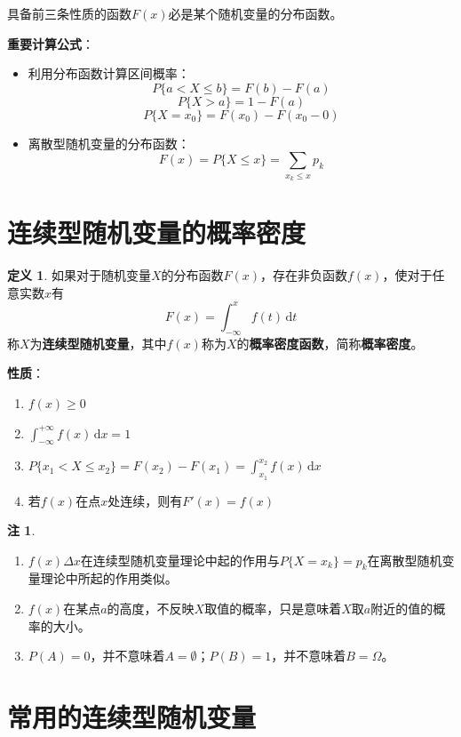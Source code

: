 \documentclass[11pt,a4paper]{report}
\theoremstyle{definition}
\newtheorem{definition}{定义}[chapter]
\newtheorem{remark}{注}[chapter]
\theoremstyle{plain}
\begin{document}
具备前三条性质的函数\(F(x)\)必是某个随机变量的分布函数。

\textbf{重要计算公式}：
\begin{itemize}[leftmargin=2em]
    \item 利用分布函数计算区间概率：
    \[
    P\{a<X\leq b\}=F(b)-F(a)
    \]
    \[
    P\{X>a\}=1-F(a)
    \]
    \[
    P\{X=x_0\}=F(x_0)-F(x_0-0)
    \]
    \item 离散型随机变量的分布函数：
    \[
    F(x)=P\{X\leq x\}=\sum_{x_k\leq x}p_k
    \]
\end{itemize}

\section{连续型随机变量的概率密度}

\begin{definition}
如果对于随机变量\(X\)的分布函数\(F(x)\)，存在非负函数\(f(x)\)，使对于任意实数\(x\)有
\[
F(x)=\int_{-\infty}^{x}f(t)\,\mathrm{d}t
\]
称\(X\)为\textbf{连续型随机变量}，其中\(f(x)\)称为\(X\)的\textbf{概率密度函数}，简称\textbf{概率密度}。
\end{definition}

\textbf{性质}：
\begin{enumerate}[label=\arabic*.,leftmargin=2em]
    \item \(f(x)\geq 0\)
    \item \(\int_{-\infty}^{+\infty}f(x)\,\mathrm{d}x=1\)
    \item \(P\{x_1<X\leq x_2\}=F(x_2)-F(x_1)=\int_{x_1}^{x_2}f(x)\,\mathrm{d}x\)
    \item 若\(f(x)\)在点\(x\)处连续，则有\(F'(x)=f(x)\)
\end{enumerate}

\begin{remark}
\begin{enumerate}[label=\arabic*.,leftmargin=2em]
    \item \(f(x)\Delta x\)在连续型随机变量理论中起的作用与\(P\{X=x_k\}=p_k\)在离散型随机变量理论中所起的作用类似。
    \item \(f(x)\)在某点\(a\)的高度，不反映\(X\)取值的概率，只是意味着\(X\)取\(a\)附近的值的概率的大小。
    \item \(P(A)=0\)，并不意味着\(A=\emptyset\)；\(P(B)=1\)，并不意味着\(B=\Omega\)。
\end{enumerate}
\end{remark}

\section{常用的连续型随机变量}
\end{document}
